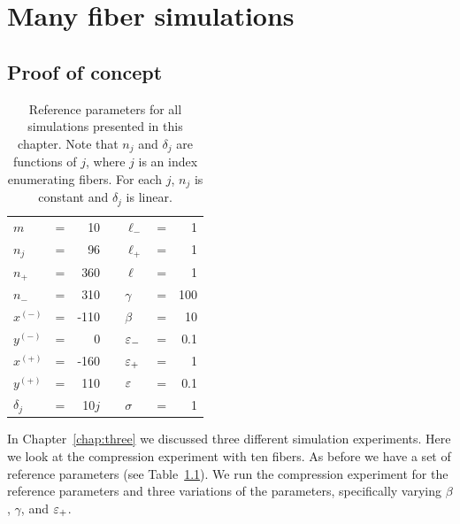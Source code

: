 \chapter{Many fiber simulations} \label{chap:four}

\section{Proof of concept}

	\begin{table}
		\centering
		\caption{Reference parameters for all simulations presented in this chapter. Note that $n_j$ and $\delta_j$ are functions of $j$, where $j$ is an index enumerating fibers. For each $j$, $n_j$ is constant and $\delta_j$ is linear. \label{table:manyfiber_reference}}
		\begin{tabular}{lcrclcr}
			$m$ & = & 10 & \hspace{1in} & $\ell_-$ & = & 1 \\
			$n_j$ & = & 96 & & $\ell_+$ & = & 1 \\
			$n_+$ & = & 360 & & $\ell$ & = & 1 \\
			$n_-$ & = & 310 & & $\gamma$ & = & 100 \\
			$x^{(-)}$ & = & -110 & & $\beta$ & = & 10 \\
			$y^{(-)}$ & = & 0 & & $\varepsilon_-$ & = & 0.1 \\
			$x^{(+)}$ & = & -160 & & $\varepsilon_+$ & = & 1 \\
			$y^{(+)}$ & = & 110 & & $\varepsilon$ & = & 0.1 \\
			$\delta_j$ & = & 10$j$ & & $\sigma$ & = & 1
		\end{tabular}
	\end{table}

	In Chapter~\ref{chap:three} we discussed three different simulation experiments. Here we look at the compression experiment with ten fibers. As before we have a set of reference parameters (see Table~\ref{table:manyfiber_reference}). We run the compression experiment for the reference parameters and three variations of the parameters, specifically varying $\beta$, $\gamma$, and $\varepsilon_+$.

